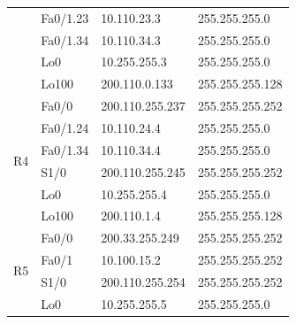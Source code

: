 \documentclass[12pt,twoside,a4paper]{report}
\begin{document}
\begin{table}[!htbp]
\begin{tabular}{|c|l|l|l|}
                     & Fa0/1.23                                & 10.110.23.3                             & 255.255.255.0                       \\ \cline{2-4} 
                     & Fa0/1.34                                & 10.110.34.3                             & 255.255.255.0                       \\ \cline{2-4} 
                     & Lo0                                     & 10.255.255.3                            & 255.255.255.0                       \\ \cline{2-4} 
                     & Lo100                                   & 200.110.0.133                           & 255.255.255.128                     \\ \hline
\multirow{6}{*}{R4}  & Fa0/0                                   & 200.110.255.237                         & 255.255.255.252                     \\ \cline{2-4} 
                     & Fa0/1.24                                & 10.110.24.4                             & 255.255.255.0                       \\ \cline{2-4} 
                     & Fa0/1.34                                & 10.110.34.4                             & 255.255.255.0                       \\ \cline{2-4} 
                     & S1/0                                    & 200.110.255.245                         & 255.255.255.252                     \\ \cline{2-4} 
                     & Lo0                                     & 10.255.255.4                            & 255.255.255.0                       \\ \cline{2-4} 
                     & Lo100                                   & 200.110.1.4                             & 255.255.255.128                     \\ \hline
\multirow{5}{*}{R5}  & Fa0/0                                   & 200.33.255.249                          & 255.255.255.252                     \\ \cline{2-4} 
                     & Fa0/1                                   & 10.100.15.2                             & 255.255.255.252                     \\ \cline{2-4} 
                     & S1/0                                    & 200.110.255.254                         & 255.255.255.252                     \\ \cline{2-4} 
                     & Lo0                                     & 10.255.255.5                            & 255.255.255.0                       \\ \cline{2-4} 

\end{tabular}
\end{table}
\end{document}
